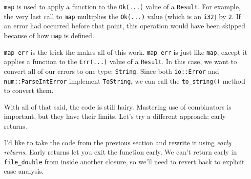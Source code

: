 \documentclass[a4paper,]{book}
\begin{document}
\texttt{map} is used to apply a function to the \texttt{Ok(...)} value
of a \texttt{Result}. For example, the very last call to \texttt{map}
multiplies the \texttt{Ok(...)} value (which is an \texttt{i32}) by
\texttt{2}. If an error had occurred before that point, this operation
would have been skipped because of how \texttt{map} is defined.

\texttt{map\_err} is the trick the makes all of this work.
\texttt{map\_err} is just like \texttt{map}, except it applies a
function to the \texttt{Err(...)} value of a \texttt{Result}. In this
case, we want to convert all of our errors to one type: \texttt{String}.
Since both \texttt{io::Error} and \texttt{num::ParseIntError} implement
\texttt{ToString}, we can call the \texttt{to\_string()} method to
convert them.

With all of that said, the code is still hairy. Mastering use of
combinators is important, but they have their limits. Let's try a
different approach: early returns.


I'd like to take the code from the previous section and rewrite it using
\emph{early returns}. Early returns let you exit the function early. We
can't return early in \texttt{file\_double} from inside another closure,
so we'll need to revert back to explicit case analysis.
\end{document}

